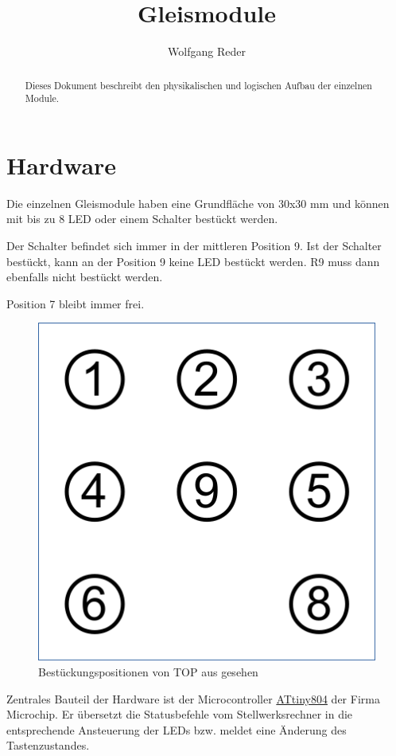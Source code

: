 \documentclass[10pt,a4paper]{article}
\author{Wolfgang Reder}
\title{Gleismodule}
\begin{document}
\maketitle
\begin{abstract}
Dieses Dokument beschreibt den physikalischen und logischen Aufbau der einzelnen Module.
\end{abstract}
\tableofcontents
\listoffigures
\listoftables
\newpage
\section{Hardware}
Die einzelnen Gleismodule haben eine Grundfläche von 30x30 mm und können mit bis zu 8 LED oder einem Schalter bestückt werden.

Der Schalter befindet sich immer in der mittleren Position 9. Ist der Schalter bestückt, kann an der Position 9 keine LED bestückt werden. R9 muss dann ebenfalls nicht bestückt werden.

Position 7 bleibt immer frei.
\begin{figure}[hbtp]
\centering
\includegraphics[scale=1]{../folien/symbol.png}
\caption[Bestückungspositionen]{Bestückungspositionen von TOP aus gesehen}
\end{figure}

Zentrales Bauteil der Hardware ist der Microcontroller \href{https://www.microchip.com/wwwproducts/en/ATtiny804}{ATtiny804} der Firma Microchip. Er übersetzt die Statusbefehle vom Stellwerksrechner in die entsprechende Ansteuerung der LEDs bzw. meldet eine Änderung des Tastenzustandes.
\end{document}
